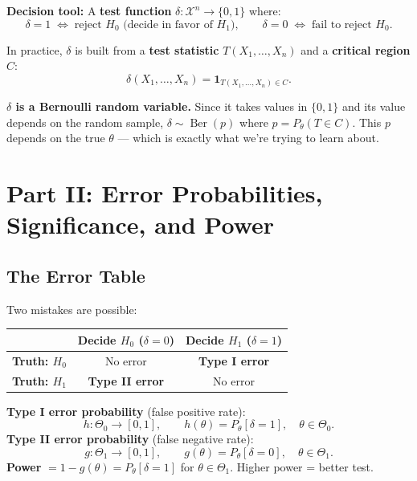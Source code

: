 \documentclass[11pt,a4paper]{article}
\begin{document}
\textbf{Decision tool:} A \textbf{test function} $\delta: \mathcal{X}^n \to \{0,1\}$ where:
\[
  \delta = 1 \;\Leftrightarrow\; \text{reject } H_0 \text{ (decide in favor of } H_1\text{)},\qquad
  \delta = 0 \;\Leftrightarrow\; \text{fail to reject } H_0.
\]

In practice, $\delta$ is built from a \textbf{test statistic} $T(X_1,\ldots,X_n)$ and a \textbf{critical region} $C$:
\[
  \delta(X_1,\ldots,X_n) = \mathbf{1}_{T(X_1,\ldots,X_n)\in C}.
\]

\begin{tcolorbox}[warnbox]
\textbf{$\delta$ is a Bernoulli random variable.} Since it takes values in $\{0,1\}$ and its value depends on the random sample, $\delta \sim \operatorname{Ber}(p)$ where $p = P_\theta(T \in C)$. This $p$ depends on the true $\theta$ --- which is exactly what we're trying to learn about.
\end{tcolorbox}

\section{Part II: Error Probabilities, Significance, and Power}

\subsection{The Error Table}

Two mistakes are possible:

\begin{center}
\renewcommand{\arraystretch}{1.5}
\begin{tabular}{@{}lcc@{}}
\toprule
& \textbf{Decide $H_0$ ($\delta=0$)} & \textbf{Decide $H_1$ ($\delta=1$)} \\
\midrule
\textbf{Truth: $H_0$} & No error & \textcolor{dangerRed}{\textbf{Type I error}} \\
\textbf{Truth: $H_1$} & \textcolor{warnOrange}{\textbf{Type II error}} & No error \\
\bottomrule
\end{tabular}
\end{center}

\begin{tcolorbox}[defbox, title={Error probability definitions (Lecture slide 6)}]
\textbf{Type I error probability} (false positive rate):
\[
  h:\Theta_0\to[0,1],\qquad h(\theta) = P_\theta[\delta=1], \quad \theta\in\Theta_0.
\]
\textbf{Type II error probability} (false negative rate):
\[
  g:\Theta_1\to[0,1],\qquad g(\theta) = P_\theta[\delta=0], \quad \theta\in\Theta_1.
\]
\textbf{Power} $= 1-g(\theta) = P_\theta[\delta=1]$ for $\theta\in\Theta_1$. Higher power = better test.
\end{tcolorbox}
\end{document}
